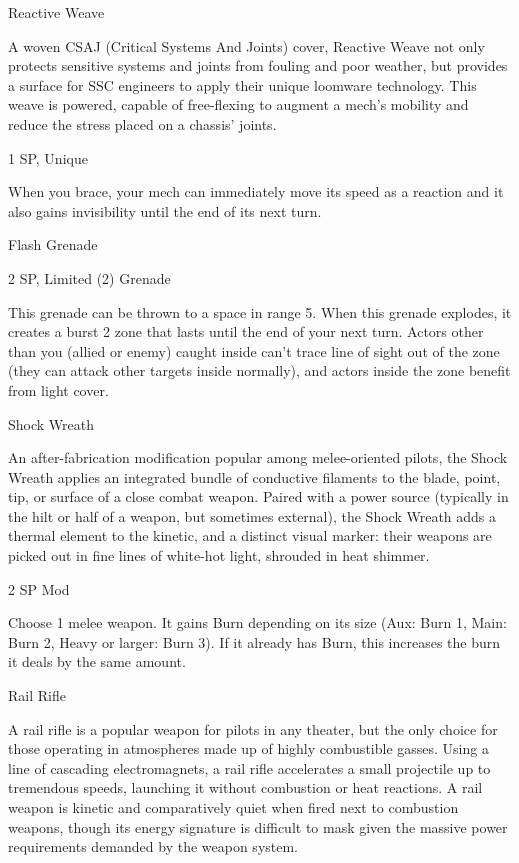 \begin{mech}
Reactive Weave

A woven CSAJ (Critical Systems And Joints) cover, Reactive Weave not only protects sensitive systems and joints from fouling and poor weather, but provides a surface for SSC engineers to apply their unique loomware technology. This weave is powered, capable of free-flexing to augment a mech’s mobility and reduce the stress placed on a chassis’ joints.

1 SP, Unique

When you brace, your mech can immediately move its speed as a reaction and it also gains invisibility until the end of its next turn.


Flash Grenade

2 SP, Limited (2)
Grenade

This grenade can be thrown to a space in range 5. When this grenade explodes, it creates a burst 2 zone that lasts until the end of your next turn. Actors other than you (allied or enemy) caught inside can’t trace line of sight out of the zone (they can attack other targets inside normally), and actors inside the zone benefit from light cover.


Shock Wreath

An after-fabrication modification popular among melee-oriented pilots, the Shock Wreath applies an integrated bundle of conductive filaments to the blade, point, tip, or surface of a close combat weapon. Paired with a power source (typically in the hilt or half of a weapon, but sometimes external), the Shock Wreath adds a thermal element to the kinetic, and a distinct visual marker: their weapons are picked out in fine lines of white-hot light, shrouded in heat shimmer.

2 SP
Mod

Choose 1 melee weapon. It gains Burn depending on its size (Aux: Burn 1, Main: Burn 2, Heavy
or larger: Burn 3). If it already has Burn, this increases the burn it deals by the same amount.


Rail Rifle

A rail rifle is a popular weapon for pilots in any theater, but the only choice for those operating in atmospheres made up of highly combustible gasses. Using a line of cascading electromagnets, a rail rifle accelerates a small projectile up to tremendous speeds, launching it without combustion or heat reactions. A rail weapon is kinetic and comparatively quiet when fired next to combustion weapons, though its energy signature is difficult to mask given the massive power requirements demanded by the weapon system.


\end{mech}
